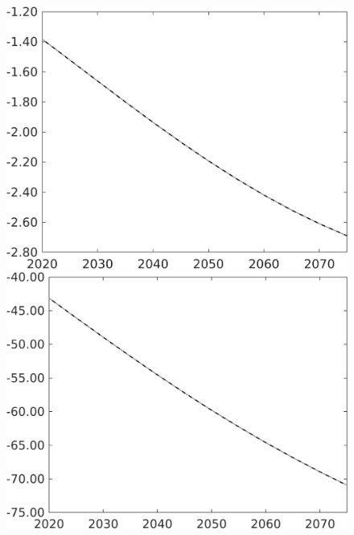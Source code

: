 \documentclass[12pt]{article}
\begin{document}
\begin{figure}[h!!]
\begin{minipage}[]{0.32\textwidth}
	\end{minipage}	
	\begin{minipage}[]{0.32\textwidth}
		\includegraphics[width=1\textwidth]{../../codding_model/own_basedOnFried/optimalPol_010922_revision/figures/all_13Sept22/PerdifNoTauf_regime0_CompTaul_C_spillover0_nsk1_xgr1_knspil1_sep1_LFlimit0_emsbase0_countec0_GovRev0_etaa0.79_lgd0.png}
	\end{minipage}	
	\begin{minipage}[]{0.32\textwidth}
		\includegraphics[width=1\textwidth]{../../codding_model/own_basedOnFried/optimalPol_010922_revision/figures/all_13Sept22/PerdifNoTauf_regime0_CompTaul_F_spillover0_nsk1_xgr1_knspil1_sep1_LFlimit0_emsbase0_countec0_GovRev0_etaa0.79_lgd0.png}

\end{minipage}
\end{figure}
\end{document}
